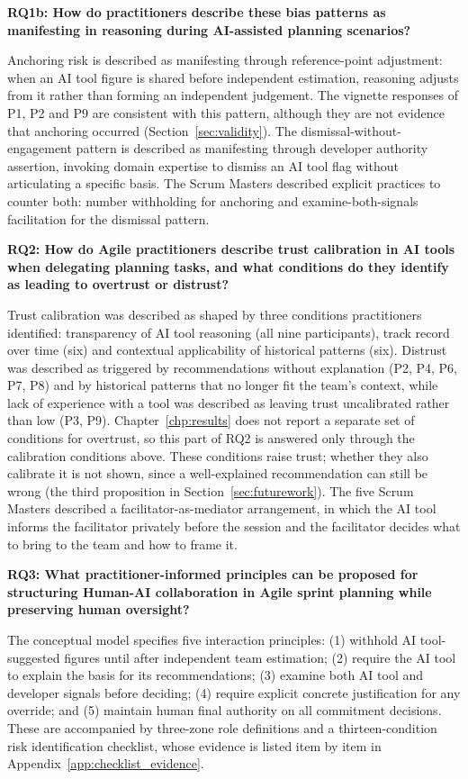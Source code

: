\documentclass[a4paper,twoside]{bth}
\begin{document}
\textbf{RQ1b: How do practitioners describe these bias patterns as manifesting in reasoning during AI-assisted planning scenarios?}

Anchoring risk is described as manifesting through reference-point adjustment: when an AI tool figure is shared before independent estimation, reasoning adjusts from it rather than forming an independent judgement. The vignette responses of P1, P2 and P9 are consistent with this pattern, although they are not evidence that anchoring occurred (Section~\ref{sec:validity}). The dismissal-without-engagement pattern is described as manifesting through developer authority assertion, invoking domain expertise to dismiss an AI tool flag without articulating a specific basis. The Scrum Masters described explicit practices to counter both: number withholding for anchoring and examine-both-signals facilitation for the dismissal pattern.

\textbf{RQ2: How do Agile practitioners describe trust calibration in AI tools when delegating planning tasks, and what conditions do they identify as leading to overtrust or distrust?}

Trust calibration was described as shaped by three conditions practitioners identified: transparency of AI tool reasoning (all nine participants), track record over time (six) and contextual applicability of historical patterns (six). Distrust was described as triggered by recommendations without explanation (P2, P4, P6, P7, P8) and by historical patterns that no longer fit the team's context, while lack of experience with a tool was described as leaving trust uncalibrated rather than low (P3, P9). Chapter~\ref{chp:results} does not report a separate set of conditions for overtrust, so this part of RQ2 is answered only through the calibration conditions above. These conditions raise trust; whether they also calibrate it is not shown, since a well-explained recommendation can still be wrong (the third proposition in Section~\ref{sec:futurework}). The five Scrum Masters described a facilitator-as-mediator arrangement, in which the AI tool informs the facilitator privately before the session and the facilitator decides what to bring to the team and how to frame it.

\textbf{RQ3: What practitioner-informed principles can be proposed for structuring Human-AI collaboration in Agile sprint planning while preserving human oversight?}

The conceptual model specifies five interaction principles: (1) withhold AI tool-suggested figures until after independent team estimation; (2) require the AI tool to explain the basis for its recommendations; (3) examine both AI tool and developer signals before deciding; (4) require explicit concrete justification for any override; and (5) maintain human final authority on all commitment decisions. These are accompanied by three-zone role definitions and a thirteen-condition risk identification checklist, whose evidence is listed item by item in Appendix~\ref{app:checklist_evidence}.
\end{document}

